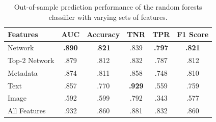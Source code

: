 
\begin{table}[ht]
\centering
\caption{Out-of-sample prediction performance of the random forests classifier with varying sets of features.}\label{tab:RF_pred_results}
\begin{tabular}{lccccc}
    \hline
    Features&	AUC&Accuracy	&TNR&	TPR&	F1 Score\\
    \hline
    \hline
    Network&\textbf{	.890} &	.\textbf{821} &	.839 &	\textbf{.797} &	\textbf{.821}\\
    Top-2 Network&	.879 &	.812 &	.832 &	.787 &	.812\\
    Metadata&	.874 &	.811 &	.858 &	.748 &	.810\\ %
    Text&	.857 &	.770 &	\textbf{.929} &	.559 &	.759\\
    Image&	.592 &	.599 &	.792 &	.343 &	.577\\
    \hline
    All Features&	.932 &	.860 &	.881 &	.832 &	.860\\ %
    \hline
\end{tabular}
\end{table}